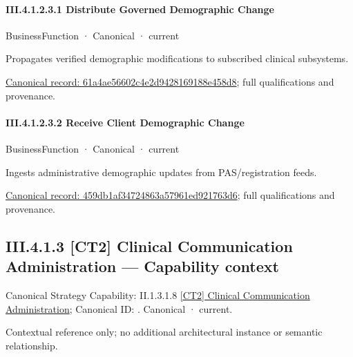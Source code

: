 \paragraph*{III.4.1.2.3.1 Distribute Governed Demographic Change}
\label{navigation:III.4.1.2.3.1}

\label{element:61a4ae56602c4e2d9428169188e458d8}
{\small BusinessFunction · Canonical · current}\par

Propagates verified demographic modifications to subscribed clinical subsystems.


{\footnotesize \href{../../../../../../../continuum/business/business-function/61a4ae56602c4e2d9428169188e458d8.md}{Canonical record: 61a4ae56602c4e2d9428169188e458d8}; full qualifications and provenance.}\par
\paragraph*{III.4.1.2.3.2 Receive Client Demographic Change}
\label{navigation:III.4.1.2.3.2}

\label{element:459db1af34724863a57961ed921763d6}
{\small BusinessFunction · Canonical · current}\par

Ingests administrative demographic updates from PAS/registration feeds.


{\footnotesize \href{../../../../../../../continuum/business/business-function/459db1af34724863a57961ed921763d6.md}{Canonical record: 459db1af34724863a57961ed921763d6}; full qualifications and provenance.}\par
\subsection*{III.4.1.3 [CT2] Clinical Communication Administration — Capability context}
\label{navigation:III.4.1.3}

{\small Canonical Strategy Capability: II.1.3.1.8 \hyperref[element:b38f2c2811724734b5887b6dbaaabbfc]{[CT2] Clinical Communication Administration}; Canonical ID: \texttt{}. Canonical · current.}\par
Contextual reference only; no additional architectural instance or semantic relationship.\par
